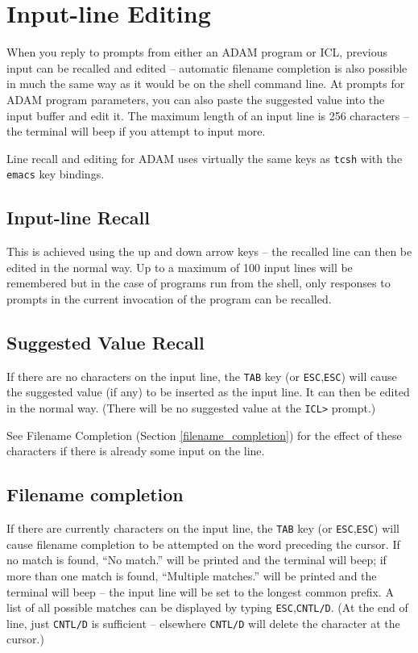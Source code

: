 \documentclass[twoside,11pt]{article}
\newcommand{\htmlref}[2]{#1}
\newcommand{\latex}[1]{#1}
\newcommand{\xlabel}[1]{}
\renewcommand{\_}{\texttt{\symbol{95}}}
\begin{document}
\section{\xlabel{input_line_editing}\label{input_line_editing}Input-line Editing}
When you reply to prompts from either an ADAM program or ICL, previous input can
be recalled and edited -- automatic filename completion is also possible in 
much the same way as it would be on the shell command line. 
At prompts for ADAM program parameters, you can also paste the suggested value 
into the input buffer and edit it. The maximum length of an input line is 256
characters -- the terminal will beep if you attempt to input more.

Line recall and editing for ADAM uses virtually the same keys as \texttt{tcsh}
with the \texttt{emacs} key bindings.

\subsection{Input-line Recall}
This is achieved using the up and down arrow keys -- the recalled line can 
then be edited in the normal way.
Up to a maximum of 100 input lines will be remembered but in the case of
programs run from the shell, only responses to prompts in the current 
invocation of the program can be recalled.

\subsection{Suggested Value Recall}
If there are no characters on the input line, the \texttt{TAB} key (or 
\texttt{ESC},\texttt{ESC}) will cause the suggested value (if any) to be 
inserted as the  input line. It can then be edited in the normal way.
(There will be no suggested value at the \texttt{ICL>} prompt.)

See 
\htmlref{Filename Completion}{filename_completion}
\latex{ (Section \ref{filename_completion})} for the effect of these
characters if there is already some input on the line.

\subsection{\label{filename_completion}Filename completion}
If there are currently characters on the input line, the \texttt{TAB} key (or
\texttt{ESC},\texttt{ESC}) will cause filename completion to be attempted on
the word preceding the cursor.
If no match is found, ``No match.'' will be printed and the terminal will beep; 
if more than one match is found, ``Multiple matches.'' will be printed and the 
terminal will beep -- the input line will be set to the longest common 
prefix.  
A list of all possible matches can be displayed by typing 
\texttt{ESC},\texttt{CNTL/D}. (At the end of line, just \texttt{CNTL/D} is
sufficient -- elsewhere \texttt{CNTL/D} will delete the character at the 
cursor.)
\end{document}
